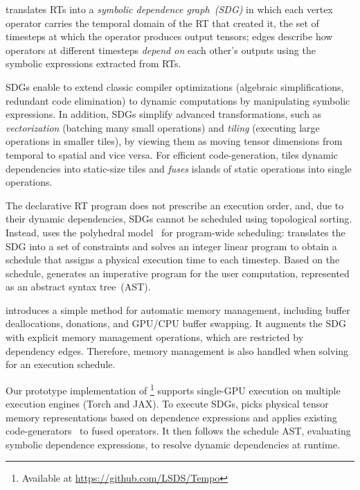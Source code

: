  \sys translates RTs into a \emph{symbolic dependence graph~(SDG)} in which each vertex operator carries the temporal domain of the RT that created it, \ie the set of timesteps at which the operator produces output tensors; edges describe how operators at different timesteps \emph{depend on} each other's outputs using the symbolic expressions extracted from RTs. 

SDGs enable \sys{} to extend classic compiler optimizations (\eg algebraic simplifications, redundant code elimination) to dynamic computations by manipulating symbolic expressions. In addition, SDGs simplify advanced transformations, such as \emph{vectorization} (batching many small operations) and \emph{tiling} (executing large operations in smaller tiles), by viewing them as moving tensor dimensions from temporal to spatial and vice versa. For efficient code-generation, \sys{} tiles dynamic dependencies into static-size tiles and \emph{fuses} islands of static operations into single operations.


 The declarative RT program does not prescribe an execution order, and, due to their dynamic dependencies, SDGs cannot be scheduled using  topological sorting. Instead, \sys{} uses the polyhedral model~\cite{verdoolaege2010isl, bondhugula2008pluto} for program-wide scheduling: \sys{} translates the SDG into a set of constraints and solves an integer linear program to obtain a schedule that assigns a physical execution time to each timestep. Based on the schedule, \sys{} generates an imperative program for the user computation, represented as an abstract syntax tree~(AST).


 \sys{} introduces a simple method for automatic memory management, including buffer deallocations, donations, and GPU/CPU buffer swapping. It augments the SDG with explicit memory management operations, which are restricted by dependency edges. Therefore, memory management is also handled when solving for an execution schedule.


\tinyskip

\noindent
Our prototype implementation of \sys{}\footnote{Available  at \url{https://github.com/LSDS/Tempo}} supports single-GPU execution on multiple execution engines (Torch and JAX). To execute SDGs, \sys{} picks physical tensor memory representations based on dependence expressions and applies existing code-generators~\cite{openxla2024} to fused operators.
It then follows the schedule AST, evaluating symbolic dependence expressions, to resolve dynamic dependencies at runtime.

